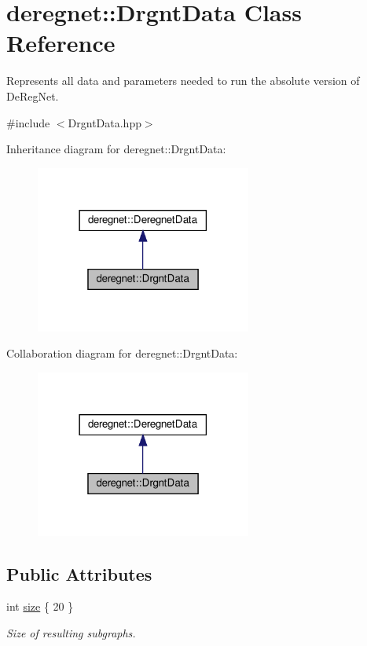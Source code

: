 \hypertarget{classderegnet_1_1DrgntData}{}\section{deregnet\+:\+:Drgnt\+Data Class Reference}
\label{classderegnet_1_1DrgntData}


Represents all data and parameters needed to run the absolute version of De\+Reg\+Net.  




{\ttfamily \#include $<$Drgnt\+Data.\+hpp$>$}



Inheritance diagram for deregnet\+:\+:Drgnt\+Data\+:\nopagebreak
\begin{figure}[H]
\begin{center}
\leavevmode
\includegraphics[width=201pt]{classderegnet_1_1DrgntData__inherit__graph}
\end{center}
\end{figure}


Collaboration diagram for deregnet\+:\+:Drgnt\+Data\+:\nopagebreak
\begin{figure}[H]
\begin{center}
\leavevmode
\includegraphics[width=201pt]{classderegnet_1_1DrgntData__coll__graph}
\end{center}
\end{figure}
\subsection*{Public Attributes}
\begin{DoxyCompactItemize}
\item 
int \hyperlink{classderegnet_1_1DrgntData_ae921ab4e0b12be7f488cfd4db2b1623c}{size} \{ 20 \}
\begin{DoxyCompactList}\small\item\em Size of resulting subgraphs. \end{DoxyCompactList}\end{DoxyCompactItemize}
